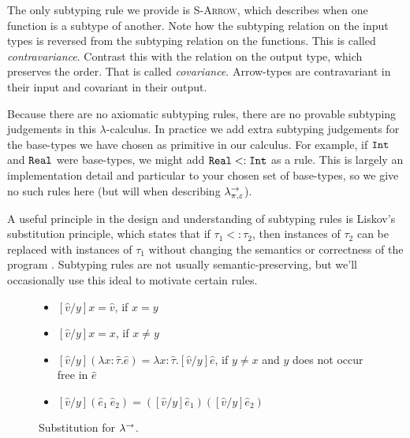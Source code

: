 The only subtyping rule we provide is \textsc{S-Arrow}, which describes when one function is a subtype of another. Note how the subtyping relation on the input types is reversed from the subtyping relation on the functions. This is called \textit{contravariance}. Contrast this with the relation on the output type, which preserves the order. That is called \textit{covariance}. Arrow-types are contravariant in their input and covariant in their output.

Because there are no axiomatic subtyping rules, there are no provable subtyping judgements in this $\lambda$-calculus. In practice we add extra subtyping judgements for the base-types we have chosen as primitive in our calculus. For example, if $\mathtt{Int}$ and $\mathtt{Real}$ were base-types, we might add $\mathtt{Real} <: \mathtt{Int}$ as a rule. This is largely an implementation detail and particular to your chosen set of base-types, so we give no such rules here (but will when describing $\lambda^{\rightarrow}_{\pi, \varepsilon}$).

A useful principle in the design and understanding of subtyping rules is Liskov's substitution principle, which states that if $\tau_1 <: \tau_2$, then instances of $\tau_2$ can be replaced with instances of $\tau_1$ without changing the semantics or correctness of the program \cite{liskov87}. Subtyping rules are not usually semantic-preserving, but we'll occasionally use this ideal to motivate certain rules.



\begin{figure}[h]


\begin{itemize}
	\setlength\itemsep{-0.7em}
	\item[] $[\hat v/y]x = \hat v$, if $x = y$
	\item[] $[\hat v/y]x = x$, if $x \neq y$
	\item[] $[\hat v/y](\lambda x: \hat \tau. \hat e) = \lambda x: \hat \tau.[\hat v/y]\hat e$, if $y \neq x$ and $y$ does not occur free in $\hat e$
	\item[] $[\hat v/y](\hat e_1~\hat e_2) = ([\hat v/y]\hat e_1)([\hat v/y]\hat e_2)$
\end{itemize}

\vspace{-7pt}
\caption{Substitution for $\lambda^{\rightarrow}$.}
\label{This is the label.}
\end{figure}

